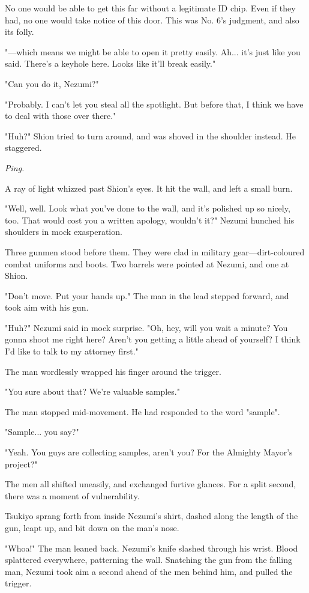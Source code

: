 No one would be able to get this far without a legitimate ID chip. Even
if they had, no one would take notice of this door. This was No. 6's
judgment, and also its folly.

"---which means we might be able to open it pretty easily. Ah... it's just
like you said. There's a keyhole here. Looks like it'll break easily."

"Can you do it, Nezumi?"

"Probably. I can't let you steal all the spotlight. But before that, I
think we have to deal with those over there."

"Huh?" Shion tried to turn around, and was shoved in the shoulder
instead. He staggered.

\emph{Ping.}

A ray of light whizzed past Shion's eyes. It hit the wall, and left a
small burn.

"Well, well. Look what you've done to the wall, and it's polished up so
nicely, too. That would cost you a written apology, wouldn't it?" Nezumi
hunched his shoulders in mock exasperation.

Three gunmen stood before them. They were clad in military
gear---dirt-coloured combat uniforms and boots. Two barrels were pointed
at Nezumi, and one at Shion.

"Don't move. Put your hands up." The man in the lead stepped forward,
and took aim with his gun.

"Huh?" Nezumi said in mock surprise. "Oh, hey, will you wait a minute?
You gonna shoot me right here? Aren't you getting a little ahead of
yourself? I think I'd like to talk to my attorney first."

The man wordlessly wrapped his finger around the trigger.

"You sure about that? We're valuable samples."

The man stopped mid-movement. He had responded to the word "sample".

"Sample... you say?"

"Yeah. You guys are collecting samples, aren't you? For the Almighty
Mayor's project?"

The men all shifted uneasily, and exchanged furtive glances. For a split
second, there was a moment of vulnerability.

Tsukiyo sprang forth from inside Nezumi's shirt, dashed along the length
of the gun, leapt up, and bit down on the man's nose.

"Whoa!" The man leaned back. Nezumi's knife slashed through his wrist.
Blood splattered everywhere, patterning the wall. Snatching the gun from
the falling man, Nezumi took aim a second ahead of the men behind him,
and pulled the trigger.


